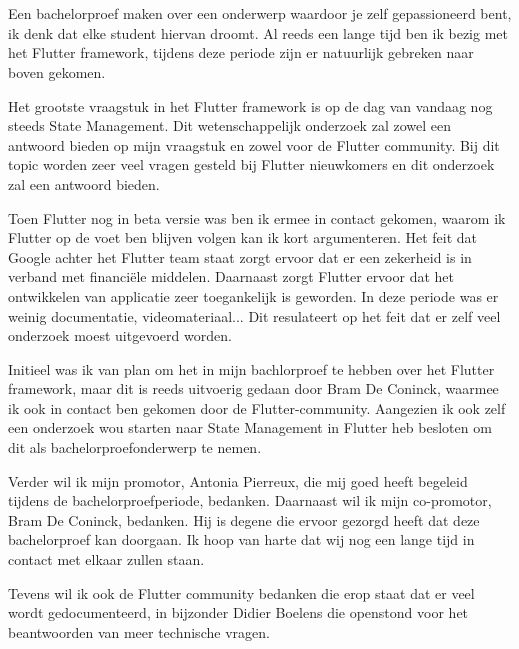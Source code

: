 
\chapter*{}
\label{ch:voorwoord}

Een bachelorproef maken over een onderwerp waardoor je zelf gepassioneerd bent, 
ik denk dat elke student hiervan droomt. Al reeds een lange tijd ben ik bezig met 
het Flutter framework, tijdens deze periode zijn er natuurlijk gebreken naar boven gekomen.

Het grootste vraagstuk in het Flutter framework is op de dag van vandaag nog steeds State Management.
Dit wetenschappelijk onderzoek zal zowel een antwoord bieden op mijn vraagstuk en zowel voor de Flutter community.
Bij dit topic worden zeer veel vragen gesteld bij Flutter nieuwkomers en dit onderzoek zal een antwoord bieden.

Toen Flutter nog in beta versie was ben ik ermee in contact gekomen, waarom ik Flutter op de voet ben blijven volgen kan ik kort argumenteren. Het feit dat Google achter het Flutter team staat zorgt ervoor dat er een zekerheid is in verband met financiële middelen. Daarnaast zorgt Flutter ervoor dat het ontwikkelen van applicatie zeer toegankelijk is geworden. In deze periode was er weinig documentatie, videomateriaal... Dit resulateert op het feit dat er zelf veel onderzoek moest uitgevoerd worden.

Initieel was ik van plan om het in mijn bachlorproef te hebben over het Flutter framework, maar dit is reeds uitvoerig gedaan door Bram De Coninck, waarmee ik ook in contact ben gekomen door de Flutter-community. Aangezien ik ook zelf een onderzoek wou starten naar State Management in Flutter heb besloten om dit als bachelorproefonderwerp te nemen.


Verder wil ik mijn promotor, Antonia Pierreux, die mij goed heeft begeleid tijdens de bachelorproefperiode, bedanken.
Daarnaast wil ik mijn co-promotor, Bram De Coninck, bedanken. Hij is degene die ervoor gezorgd heeft dat deze bachelorproef kan doorgaan. Ik hoop van harte dat wij nog een lange tijd in contact met elkaar zullen staan.

Tevens wil ik ook de Flutter community bedanken die erop staat dat er veel wordt gedocumenteerd, in bijzonder Didier Boelens die openstond voor het beantwoorden van meer technische vragen.
